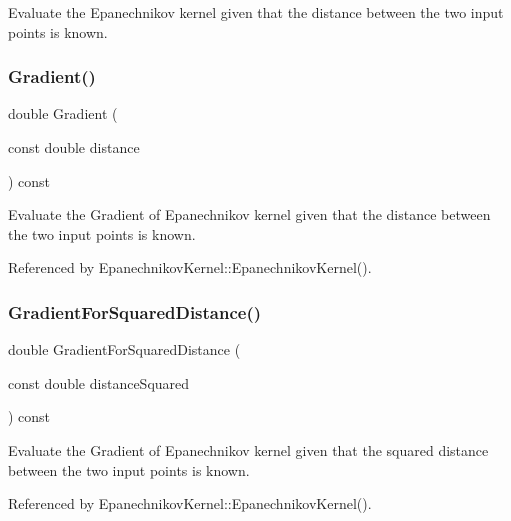 Evaluate the Epanechnikov kernel given that the distance between the two input points is known. 

\mbox{\label{classmlpack_1_1kernel_1_1EpanechnikovKernel_ac83f017e98c3f23c603fb26b50b82cfd}} 
\subsubsection{Gradient()}
{\footnotesize\ttfamily double Gradient (\begin{DoxyParamCaption}\item[{const double}]{distance }\end{DoxyParamCaption}) const}



Evaluate the Gradient of Epanechnikov kernel given that the distance between the two input points is known. 



Referenced by Epanechnikov\+Kernel\+::\+Epanechnikov\+Kernel().

\mbox{\label{classmlpack_1_1kernel_1_1EpanechnikovKernel_aa993982e3ab29e7c8a299012dbe42cc5}} 
\subsubsection{Gradient\+For\+Squared\+Distance()}
{\footnotesize\ttfamily double Gradient\+For\+Squared\+Distance (\begin{DoxyParamCaption}\item[{const double}]{distance\+Squared }\end{DoxyParamCaption}) const}



Evaluate the Gradient of Epanechnikov kernel given that the squared distance between the two input points is known. 



Referenced by Epanechnikov\+Kernel\+::\+Epanechnikov\+Kernel().

\mbox{\label{classmlpack_1_1kernel_1_1EpanechnikovKernel_aa500736f2a5dac08fa9027543c2b05cb}} 
